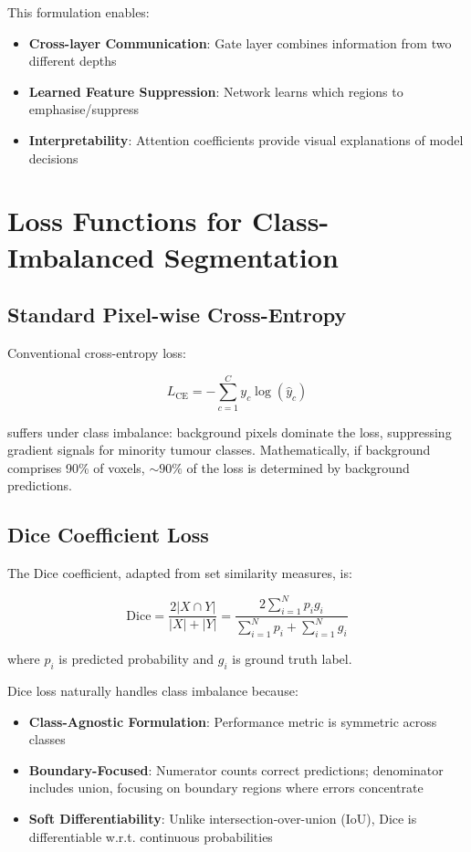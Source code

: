 \documentclass{ecsproject}     %
\begin{document}
This formulation enables:
\begin{itemize}
    \item \textbf{Cross-layer Communication}: Gate layer combines information from two different depths
    \item \textbf{Learned Feature Suppression}: Network learns which regions to emphasise/suppress
    \item \textbf{Interpretability}: Attention coefficients provide visual explanations of model decisions
\end{itemize}

\section{Loss Functions for Class-Imbalanced Segmentation}

\subsection{Standard Pixel-wise Cross-Entropy}

Conventional cross-entropy loss:

\begin{equation}
L_{\text{CE}} = -\sum_{c=1}^{C} y_c \log(\hat{y}_c)
\label{Eq:CrossEntropy}
\end{equation}

suffers under class imbalance: background pixels dominate the loss, suppressing gradient signals for minority tumour classes. Mathematically, if background comprises 90\% of voxels, $\sim 90\%$ of the loss is determined by background predictions.

\subsection{Dice Coefficient Loss}

The Dice coefficient, adapted from set similarity measures, is:

\begin{equation}
\text{Dice} = \frac{2|X \cap Y|}{|X| + |Y|} = \frac{2\sum_{i=1}^{N} p_i g_i}{\sum_{i=1}^{N} p_i + \sum_{i=1}^{N} g_i}
\label{Eq:DiceCoeff}
\end{equation}

where $p_i$ is predicted probability and $g_i$ is ground truth label.

Dice loss naturally handles class imbalance because:
\begin{itemize}
    \item \textbf{Class-Agnostic Formulation}: Performance metric is symmetric across classes
    \item \textbf{Boundary-Focused}: Numerator counts correct predictions; denominator includes union, focusing on boundary regions where errors concentrate
    \item \textbf{Soft Differentiability}: Unlike intersection-over-union (IoU), Dice is differentiable w.r.t. continuous probabilities
\end{itemize}
\end{document}
